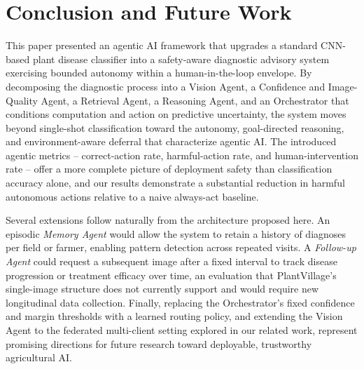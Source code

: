 \documentclass[conference]{IEEEtran}
\begin{document}
\section{Conclusion and Future Work}
\label{sec:conclusion}

This paper presented an agentic AI framework that upgrades a standard CNN-based plant disease classifier into a safety-aware diagnostic advisory system exercising bounded autonomy within a human-in-the-loop envelope. By decomposing the diagnostic process into a Vision Agent, a Confidence and Image-Quality Agent, a Retrieval Agent, a Reasoning Agent, and an Orchestrator that conditions computation and action on predictive uncertainty, the system moves beyond single-shot classification toward the autonomy, goal-directed reasoning, and environment-aware deferral that characterize agentic AI. The introduced agentic metrics -- correct-action rate, harmful-action rate, and human-intervention rate -- offer a more complete picture of deployment safety than classification accuracy alone, and our results demonstrate a substantial reduction in harmful autonomous actions relative to a naive always-act baseline.

Several extensions follow naturally from the architecture proposed here. An episodic \emph{Memory Agent} would allow the system to retain a history of diagnoses per field or farmer, enabling pattern detection across repeated visits. A \emph{Follow-up Agent} could request a subsequent image after a fixed interval to track disease progression or treatment efficacy over time, an evaluation that PlantVillage's single-image structure does not currently support and would require new longitudinal data collection. Finally, replacing the Orchestrator's fixed confidence and margin thresholds with a learned routing policy, and extending the Vision Agent to the federated multi-client setting explored in our related work, represent promising directions for future research toward deployable, trustworthy agricultural AI.
\end{document}

